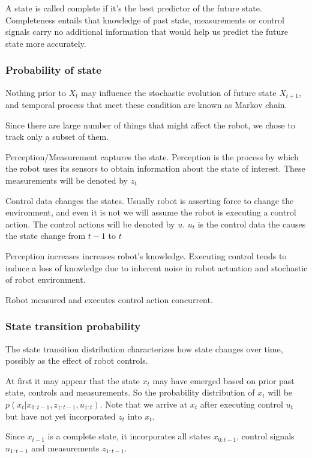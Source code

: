 \documentclass{article}
\begin{document}
A state is called complete if it's the best predictor of the future state. Completeness entails that knowledge of past state, measurements or control signals carry no additional information that would help us predict the future state more accurately.

\subsubsection{Probability of state}
Nothing prior to $X_t$ may influence the stochastic evolution of future state $X_{t+1}$, and temporal process that meet these condition are known as Markov chain.

Since there are large number of things that might affect the robot, we chose to track only a subset of them. 

Perception/Measurement captures the state. Perception is the process by which the robot uses its sensors to obtain information about the state of interest. These measurements will be denoted by $z_t$

Control data changes the states. Usually robot is asserting force to change the environment, and even it is not we will assume the robot is executing a control action. The control actions will be denoted by $u$. $u_t$ is the control data the causes the state change from $t-1$ to $t$

Perception increases increases robot's knowledge. Executing control tends to induce a loss of knowledge due to inherent noise in robot actuation and stochastic of robot environment. 

Robot measured and executes control action concurrent.

\subsubsection{State transition probability}
The state transition distribution characterizes how state changes over time, possibly as the effect of robot controls.

At first it may appear that the state $x_t$ may have emerged based on prior past state, controls and measurements. So the probability distribution of $x_t$ will be $p(x_t | x_{0:t-1}, z_{1:t-1}, u_{1:t})$. Note that we arrive at $x_t$ after executing control $u_t$ but have not yet incorporated $z_t$ into $x_t$.

Since $x_{t-1}$ is a complete state, it incorporates all states $x_{0:t-1}$, control signals $u_{1:t-1}$ and measurements $z_{1:t-1}$.
\end{document}
